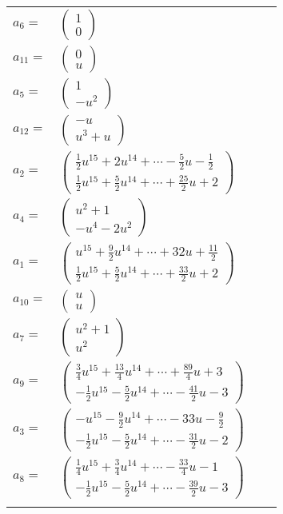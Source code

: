\documentclass[1p]{elsarticle_modified}
\theoremstyle{definition}
\begin{document}
\begin{tabular}{m{7pt} m{180pt} m{7pt} m{180pt} }
\flushright $a_{6}=$&$\begin{pmatrix}1\\0\end{pmatrix}$ \\
\flushright $a_{11}=$&$\begin{pmatrix}0\\u\end{pmatrix}$ \\
\flushright $a_{5}=$&$\begin{pmatrix}1\\- u^2\end{pmatrix}$ \\
\flushright $a_{12}=$&$\begin{pmatrix}- u\\u^3+u\end{pmatrix}$ \\
\flushright $a_{2}=$&$\begin{pmatrix}\frac{1}{2} u^{15}+2 u^{14}+\cdots-\frac{5}{2} u-\frac{1}{2}\\\frac{1}{2} u^{15}+\frac{5}{2} u^{14}+\cdots+\frac{25}{2} u+2\end{pmatrix}$ \\
\flushright $a_{4}=$&$\begin{pmatrix}u^2+1\\- u^4-2 u^2\end{pmatrix}$ \\
\flushright $a_{1}=$&$\begin{pmatrix}u^{15}+\frac{9}{2} u^{14}+\cdots+32 u+\frac{11}{2}\\\frac{1}{2} u^{15}+\frac{5}{2} u^{14}+\cdots+\frac{33}{2} u+2\end{pmatrix}$ \\
\flushright $a_{10}=$&$\begin{pmatrix}u\\u\end{pmatrix}$ \\
\flushright $a_{7}=$&$\begin{pmatrix}u^2+1\\u^2\end{pmatrix}$ \\
\flushright $a_{9}=$&$\begin{pmatrix}\frac{3}{4} u^{15}+\frac{13}{4} u^{14}+\cdots+\frac{89}{4} u+3\\-\frac{1}{2} u^{15}-\frac{5}{2} u^{14}+\cdots-\frac{41}{2} u-3\end{pmatrix}$ \\
\flushright $a_{3}=$&$\begin{pmatrix}- u^{15}-\frac{9}{2} u^{14}+\cdots-33 u-\frac{9}{2}\\-\frac{1}{2} u^{15}-\frac{5}{2} u^{14}+\cdots-\frac{31}{2} u-2\end{pmatrix}$ \\
\flushright $a_{8}=$&$\begin{pmatrix}\frac{1}{4} u^{15}+\frac{3}{4} u^{14}+\cdots-\frac{33}{4} u-1\\-\frac{1}{2} u^{15}-\frac{5}{2} u^{14}+\cdots-\frac{39}{2} u-3\end{pmatrix}$\\&\end{tabular}
\end{document}

